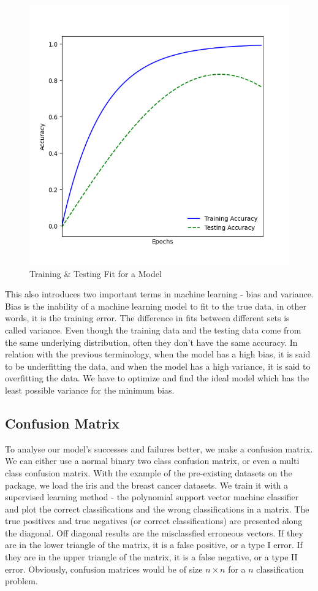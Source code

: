 \documentclass{article}
\newcommand{\code}[1]{{\fontfamily{zi4} \selectfont{#1}}}
\begin{document}
\begin{figure}[H]
\centering
\includegraphics[width=.5\linewidth]{Images/curve_fit.png}
\caption{Training \& Testing Fit for a Model}
\end{figure}

This also introduces two important terms in machine learning - bias and variance. Bias is the inability of a machine learning model to fit to the true data, in other words, it is the training error. The difference in fits between different sets is called variance. Even though the training data and the testing data come from the same underlying distribution, often they don't have the same accuracy. In relation with the previous terminology, when the model has a high bias, it is said to be underfitting the data, and when the model has a high variance, it is said to overfitting the data. We have to optimize and find the ideal model which has the least possible variance for the minimum bias. 

\subsection{Confusion Matrix}

To analyse our model's successes and failures better, we make a confusion matrix. We can either use a normal binary two class confusion matrix, or even a multi class confusion matrix. With the example of the pre-existing datasets on the \code{sklearn} package, we load the iris and the breast cancer datasets. We train it with a supervised learning method - the polynomial support vector machine classifier and plot the correct classifications and the wrong classifications in a matrix. The true positives and true negatives (or correct classifications) are presented along the diagonal. Off diagonal results are the misclassfied erroneous vectors. If they are in the lower triangle of the matrix, it is a false positive, or a type I error. If they are in the upper triangle of the matrix, it is a false negative, or a type II error. Obviously, confusion matrices would be of size $n \times n$ for a $n$ classification problem.	
\end{document}
